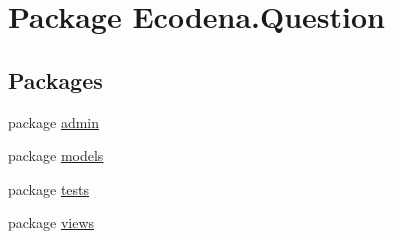 \hypertarget{namespace_ecodena_1_1_question}{
\section{Package Ecodena.Question}
\label{d3/d81/namespace_ecodena_1_1_question}
}
\subsection*{Packages}
\begin{DoxyCompactItemize}
\item 
package \hyperlink{namespace_ecodena_1_1_question_1_1admin}{admin}
\item 
package \hyperlink{namespace_ecodena_1_1_question_1_1models}{models}
\item 
package \hyperlink{namespace_ecodena_1_1_question_1_1tests}{tests}
\item 
package \hyperlink{namespace_ecodena_1_1_question_1_1views}{views}
\end{DoxyCompactItemize}
